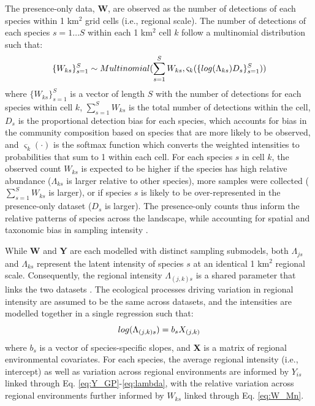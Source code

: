 \documentclass[preprint,review,times,12pt,3p]{elsarticle}
\begin{document}
The presence-only data, \textbf{W}, are observed as the number of detections of each species within 1 km$^2$ grid cells (i.e., regional scale). The number of detections of each species $s=1 \dots S$ within each 1 km$^2$ cell $k$ follow a multinomial distribution such that:
    \begin{equation}
        \{W_{ks}\}_{s=1}^{S} \sim Multinomial(\sum_{s=1}^{S} W_{ks} , \varsigma_k(\{log(\Lambda_{ks})D_s\}_{s=1}^{S})) \\
        \label{eq:W_Mn}
    \end{equation}
where $\{W_{ks}\}_{s=1}^{S}$ is a vector of length $S$ with the number of detections for each species within cell $k$, $\sum_{s=1}^{S} W_{ks}$ is the total number of detections within the cell, $D_s$ is the proportional detection bias for each species, which accounts for bias in the community composition based on species that are more likely to be observed, and $\varsigma_k(\cdot)$ is the softmax function which converts the weighted intensities to probabilities that sum to 1 within each cell. For each species $s$ in cell $k$, the observed count $W_{ks}$ is expected to be higher if the species has high relative abundance ($\Lambda_{ks}$ is larger relative to other species), more samples were collected ($\sum_{s=1}^{S} W_{ks}$ is larger), or if species $s$ is likely to be over-represented in the presence-only dataset ($D_s$ is larger). The presence-only counts thus inform the relative patterns of species across the landscape, while accounting for spatial and taxonomic bias in sampling intensity \citep{Isaac2014}.

While \textbf{W} and \textbf{Y} are each modelled with distinct sampling submodels, both $\Lambda_{js}$ and $\Lambda_{ks}$ represent the latent intensity of species $s$ at an identical 1 km$^2$ regional scale. Consequently, the regional intensity $\Lambda_{(j,k)s}$ is a shared parameter that links the two datasets \citep{Hefley2016,Isaac2019,Miller2019}. The ecological processes driving variation in regional intensity are assumed to be the same across datasets, and the intensities are modelled together in a single regression such that:
    \begin{equation}
        log(\Lambda_{(j,k)s}) = b_s X_{(j,k)} \\
        \label{eq:LAMBDA}
    \end{equation}
where $b_s$ is a vector of species-specific slopes, and \textbf{X} is a matrix of regional environmental covariates. For each species, the average regional intensity (i.e., intercept) as well as variation across regional environments are informed by $Y_{is}$ linked through Eq. \ref{eq:Y_GP}-\ref{eq:lambda}, with the relative variation across regional environments further informed by $W_{ks}$ linked through Eq. \ref{eq:W_Mn}.  
\end{document}
